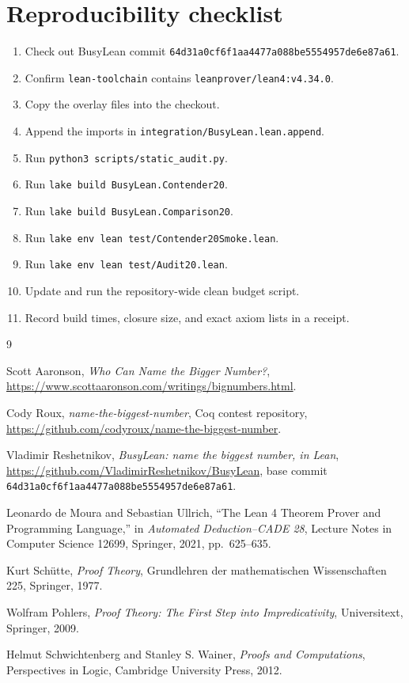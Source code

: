 \documentclass[11pt]{article}
\theoremstyle{definition}
\theoremstyle{remark}
\newcommand{\code}[1]{\texttt{#1}}
\begin{document}


\section{Reproducibility checklist}

\begin{enumerate}[leftmargin=*]
\item Check out BusyLean commit
  \code{64d31a0cf6f1aa4477a088be5554957de6e87a61}.
\item Confirm \code{lean-toolchain} contains
  \code{leanprover/lean4:v4.34.0}.
\item Copy the overlay files into the checkout.
\item Append the imports in \code{integration/BusyLean.lean.append}.
\item Run \code{python3 scripts/static\_audit.py}.
\item Run \code{lake build BusyLean.Contender20}.
\item Run \code{lake build BusyLean.Comparison20}.
\item Run \code{lake env lean test/Contender20Smoke.lean}.
\item Run \code{lake env lean test/Audit20.lean}.
\item Update and run the repository-wide clean budget script.
\item Record build times, closure size, and exact axiom lists in a receipt.
\end{enumerate}

\begin{thebibliography}{9}

Scott Aaronson,
\emph{Who Can Name the Bigger Number?},
\url{https://www.scottaaronson.com/writings/bignumbers.html}.

Cody Roux,
\emph{name-the-biggest-number}, Coq contest repository,
\url{https://github.com/codyroux/name-the-biggest-number}.

Vladimir Reshetnikov,
\emph{BusyLean: name the biggest number, in Lean},
\url{https://github.com/VladimirReshetnikov/BusyLean},
base commit \code{64d31a0cf6f1aa4477a088be5554957de6e87a61}.

Leonardo de Moura and Sebastian Ullrich,
``The Lean 4 Theorem Prover and Programming Language,''
in \emph{Automated Deduction--CADE 28},
Lecture Notes in Computer Science 12699, Springer, 2021, pp.~625--635.

Kurt Sch\"utte,
\emph{Proof Theory},
Grundlehren der mathematischen Wissenschaften 225,
Springer, 1977.

Wolfram Pohlers,
\emph{Proof Theory: The First Step into Impredicativity},
Universitext, Springer, 2009.

Helmut Schwichtenberg and Stanley S. Wainer,
\emph{Proofs and Computations},
Perspectives in Logic, Cambridge University Press, 2012.

\end{thebibliography}
\end{document}

